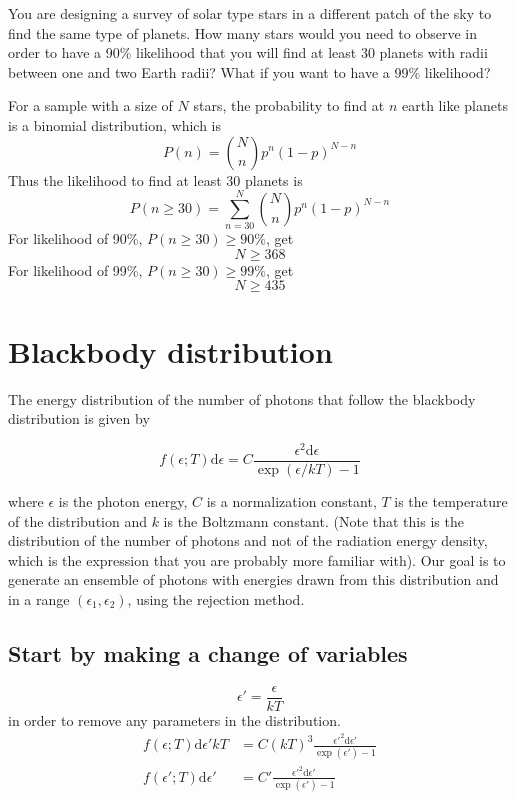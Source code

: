 \documentclass[paper=letter, fontsize=11pt]{scrartcl} %
\numberwithin{equation}{section} %
\numberwithin{figure}{section} %
\numberwithin{table}{section} %
\begin{document}
You are designing a survey of solar type stars in a
different patch of the sky to find the same type of planets. How
many stars would you need to observe in order to have a 90\%
likelihood that you will find at least 30 planets with radii
between one and two Earth radii? What if you want to have a 99\%
likelihood?

For a sample with a size of $N$ stars, the probability to find at $n$
earth like planets is a binomial distribution, which is
\begin{equation}
  P(n) = \binom{N}{n} p^{n}(1-p)^{N-n}
\end{equation}
Thus the likelihood to find at least 30 planets is
\begin{equation}
  \label{eqn:binom}
  P(n\ge 30) = \sum_{n=30}^{N}\binom{N}{n} p^{n}(1-p)^{N-n}
\end{equation}
For likelihood of 90\%, $P(n\ge 30) \ge 90\%$, get
\begin{equation}
  N \ge 368
\end{equation}
For likelihood of 99\%, $P(n\ge 30) \ge 99\%$, get
\begin{equation}
  N \ge 435
\end{equation}

\section{Blackbody distribution}
\newcommand{\epsi}{\ensuremath{\epsilon}}
\newcommand{\dd}{\ensuremath{\mathrm{d}}}
The energy distribution of the number of photons that follow the
blackbody distribution is given by

\begin{equation}
  f(\epsi;T)\dd \epsi = C \frac{\epsi^{2}\dd \epsi}{\exp(\epsi/kT)-1}
\end{equation}

where $\epsi$ is the photon energy, $C$ is a normalization constant,
$T$ is the temperature of the distribution and $k$ is the Boltzmann
constant. (Note that this is the distribution of the number of photons
and not of the radiation energy density, which is the expression that
you are probably more familiar with). Our goal is to generate an
ensemble of photons with energies drawn from this distribution and in
a range $(\epsi_{1}, \epsi_{2})$, using the rejection method.

\subsection{Start by making a change of variables}
  \begin{equation}
    \epsi' = \frac{\epsi}{kT}
  \end{equation}
  in order to remove any parameters in the distribution.
  \begin{align}
    f(\epsi; T)\dd \epsi' kT &= C (kT)^{3} \frac{\epsi'^{2}\dd
                              \epsi'}{\exp(\epsi') -1}\\
    f(\epsi'; T)\dd \epsi' &= C' \frac{\epsi'^{2}\dd \epsi'}{\exp(\epsi')-1}
  \end{align}
\end{document}
